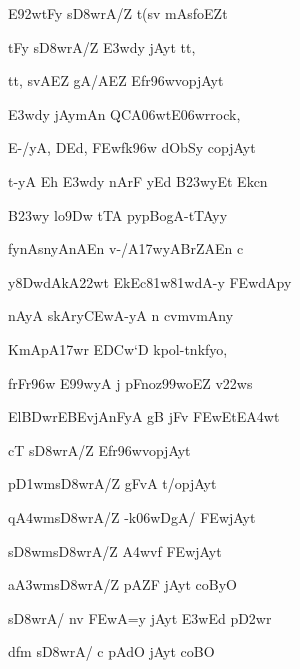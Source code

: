 {\dn E\392wtFy\2 s\3D8wrA/\?Z t(sv{\rdt} mA\2sfoEZt \vegdn\dontdisplaylinenum}

{\dn {}tFy\2 s\3D8wrA/\?Z \3E3wdy\2 jAyt\? tt,{\dandabdn} \dontdisplaylinenum}

{\dn tt, svA\0EZ gA/AEZ Efr\396w\4vopjAyt\? \vegdn\dontdisplaylinenum}

{\dn \3E3wdy\? jAymAn\?  QCA\0\306wtE\306wrrock,{\dandabdn} \dontdisplaylinenum}

{\dn E-/yA, DEd\0, \3FEwf\?k\396w dOb\0Sy\2 copjAyt\? \vegdn\dontdisplaylinenum}

{\dn t-yA Eh \3E3wdy\2 nArF yEd B\323wyEt Ek\2cn{\dandabdn} \dontdisplaylinenum}

{\dn B\323wy\2 lo\39Dw\2 tTA p\?ypBogA-tTAyy \vegdn\dontdisplaylinenum}

{\dn fynAsnyAnAEn v-/A\317wyABrZAEn c{\dandabdn} \dontdisplaylinenum}

{\dn y\38DwdAkA\2\322wt\? Ek\2Ec\381w\381wdA-y\4 \3FEwdApy\? \vegdn\dontdisplaylinenum}

{\dn nAyA s\2kAry\?\3CEwA-yA n c\4vmvmAny\? \dontdisplaylinenum}

{\dn {}KmApA\317wr\2 E\3DCw`D\2 kpol-tnk\?fyo, \vegdn\dontdisplaylinenum}

{\dn frFr\396w E\399wyA j\2 pFnoz\399woEZ v\322ws \dontdisplaylinenum}

{\dn El\3BDw\?r\?EBEv\0jAnFyA\2 gB\?{\qvb} jFv\2 \3FEwEtE\3A4wt \vegdn\dontdisplaylinenum}

{\dn cT\?{\qvb} s\3D8wrA/\?Z Efr\396w\4vopjAyt\?{\dandabdn} \dontdisplaylinenum}

{\dn p\3D1wms\3D8wrA/\?Z g\5FvA t/opjAyt\? \vegdn\dontdisplaylinenum}

{\dn q\3A4wms\3D8wrA/\?Z -k\306wDgA/\2 \3FEwjAyt\?{\dandabdn} \dontdisplaylinenum}

{\dn s\3D8wms\3D8wrA/\?Z \3A4wv\2f \3FEwjAyt\? \vegdn\dontdisplaylinenum}

{\dn a\3A3wms\3D8wrA/\?Z pAZF jAyt\? coByO{\dandabdn} \dontdisplaylinenum}

{\dn s\3D8wrA/\2 nv \3FEwA=y jAyt\? \3E3wEd p\3D2wr \vegdn\dontdisplaylinenum}

{\dn dfm\? s\3D8wrA/\? c pAdO jAyt\? coBO{\dandabdn} \dontdisplaylinenum}

